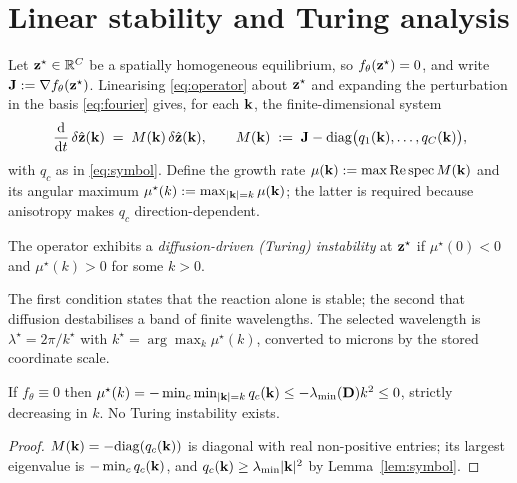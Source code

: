 \section{Linear stability and Turing analysis}
\label{app:turing}

Let $\mathbf{z}^\star\in\mathbb{R}^C$ be a spatially homogeneous equilibrium, so
$f_\theta(\mathbf{z}^\star)=0$, and write $\mathbf{J} := \nabla f_\theta(\mathbf{z}^\star)$.
Linearising \eqref{eq:operator} about $\mathbf{z}^\star$ and expanding the perturbation
in the basis \eqref{eq:fourier} gives, for each $\mathbf{k}$, the finite-dimensional
system
\begin{equation}
\frac{\mathrm{d}}{\mathrm{d} t}\,\delta\hat{\mathbf{z}}(\mathbf{k})
  \;=\; M(\mathbf{k})\,\delta\hat{\mathbf{z}}(\mathbf{k}),
\qquad
M(\mathbf{k}) \;:=\; \mathbf{J} - \mathrm{diag}\big(q_1(\mathbf{k}),\dots,q_C(\mathbf{k})\big),
\label{eq:linearised}
\end{equation}
with $q_c$ as in \eqref{eq:symbol}. Define the growth rate
$\mu(\mathbf{k}) := \max\mathrm{Re}\,\mathrm{spec}\,M(\mathbf{k})$ and its angular maximum
$\mu^\star(k) := \max_{|\mathbf{k}|=k}\mu(\mathbf{k})$; the latter is required because
anisotropy makes $q_c$ direction-dependent.

\begin{definition}
\label{def:turing}
The operator exhibits a \emph{diffusion-driven (Turing) instability} at
$\mathbf{z}^\star$ if $\mu^\star(0)<0$ and $\mu^\star(k)>0$ for some $k>0$.
\end{definition}

The first condition states that the reaction alone is stable; the second that
diffusion destabilises a band of finite wavelengths. The selected wavelength is
$\lambda^\star = 2\pi/k^\star$ with $k^\star = \arg\max_k \mu^\star(k)$,
converted to microns by the stored coordinate scale.

\begin{proposition}
\label{prop:nopattern}
If $f_\theta\equiv0$ then $\mu^\star(k) = -\min_c \min_{|\mathbf{k}|=k} q_c(\mathbf{k}) \le
-\lambda_{\min}(\mathbf{D})k^2 \le 0$, strictly decreasing in $k$. No Turing
instability exists.
\end{proposition}

\begin{proof}
$M(\mathbf{k})=-\mathrm{diag}(q_c(\mathbf{k}))$ is diagonal with real non-positive entries;
its largest eigenvalue is $-\min_c q_c(\mathbf{k})$, and $q_c(\mathbf{k})\ge\lambda_{\min}|\mathbf{k}|^2$
by Lemma~\ref{lem:symbol}.
\end{proof}

